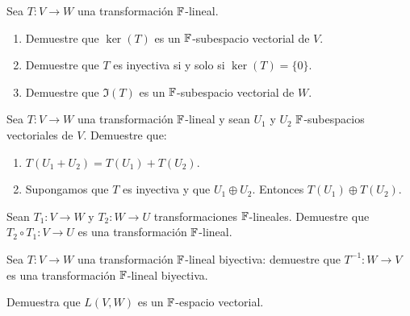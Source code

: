 \begin{exerciselist}
  \item Sea $T\colon V \to W$ una transformación $\mathbb{F}$-lineal.
    \begin{enumerate}
      \item Demuestre que $\ker(T)$ es un $\mathbb{F}$-subespacio vectorial de $V$.
      \item Demuestre que $T$ es inyectiva si y solo si $\ker(T) = \{0\}$.
      \item Demuestre que $\Im(T)$ es un $\mathbb{F}$-subespacio vectorial de $W$.
    \end{enumerate}

  \item Sea $T\colon V \to W$ una transformación $\mathbb{F}$-lineal y sean $U_1$ y $U_2$ $\mathbb{F}$-subespacios vectoriales de $V$. Demuestre que:
    \begin{enumerate}
      \item $T(U_1 + U_2) = T(U_1) + T(U_2)$.
      \item Supongamos que $T$ es inyectiva y que $U_1 \oplus U_2$. Entonces $T(U_1) \oplus T(U_2)$.
    \end{enumerate}

  \item Sean $T_1\colon V \to W$ y $T_2\colon W \to U$ transformaciones $\mathbb{F}$-lineales. Demuestre que $T_2 \circ T_1 \colon V \to U$ es una transformación $\mathbb{F}$-lineal.
  
  \item Sea $T\colon V \to W$ una transformación $\mathbb{F}$-lineal biyectiva: demuestre que $T^{-1}\colon W \to V$ es una transformación $\mathbb{F}$-lineal biyectiva.
  
  \item Demuestra que $L(V,W)$ es un $\mathbb{F}$-espacio vectorial.
\end{exerciselist}